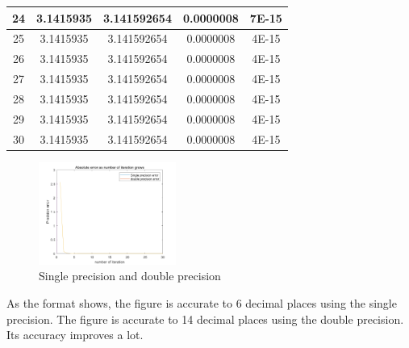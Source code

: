 \documentclass{article}
\begin{document}
\begin{center}
\begin{longtable}{|c|c|c|c|c|}
24	&	3.1415935	&	3.141592654	&	0.0000008	&	7E-15	\\ \hline
25	&	3.1415935	&	3.141592654	&	0.0000008	&	4E-15	\\ \hline
26	&	3.1415935	&	3.141592654	&	0.0000008	&	4E-15	\\ \hline
27	&	3.1415935	&	3.141592654	&	0.0000008	&	4E-15	\\ \hline
28	&	3.1415935	&	3.141592654	&	0.0000008	&	4E-15	\\ \hline
29	&	3.1415935	&	3.141592654	&	0.0000008	&	4E-15	\\ \hline
30	&	3.1415935	&	3.141592654	&	0.0000008	&	4E-15	\\ \hline
\end{longtable}
\end{center}
\begin{figure}[H]
\centering
\includegraphics[width=0.4\textwidth,height=0.3\textwidth]{precision1.png}
\caption{Single precision and double precision}
\end{figure}
As the format shows, the figure is accurate to 6 decimal places using the single precision. The figure is accurate to 14 decimal places using the double precision. Its accuracy improves a lot.
\end{document}

